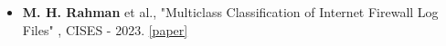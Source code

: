 \documentclass[a4paper, 12pt]{article}
\begin{document}
\begin{itemize}[noitemsep, topsep=0pt, partopsep=0pt, parsep=0pt]
	\item \textbf{M. H. Rahman} et al., "Multiclass Classification of Internet Firewall Log Files" , CISES - 2023. {\href{https://ieeexplore.ieee.org/document/10183601}{[paper]}}
\end{itemize}

\end{document}
